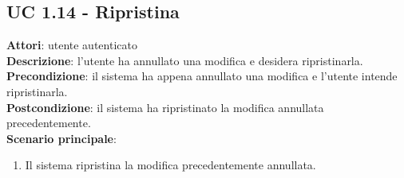 \subsection{UC 1.14 - Ripristina}{
	\label{uc1.14}
	\textbf{Attori}: utente autenticato \\
	\textbf{Descrizione}: l'utente ha annullato una modifica e desidera ripristinarla. \\
	\textbf{Precondizione}: il sistema ha appena annullato una modifica e l'utente intende ripristinarla.	\\
	\textbf{Postcondizione}: il sistema ha ripristinato la modifica annullata precedentemente.	\\
	\textbf{Scenario principale}:
	\begin{enumerate}
		\item Il sistema ripristina la modifica precedentemente annullata.
	\end{enumerate}			
	}
